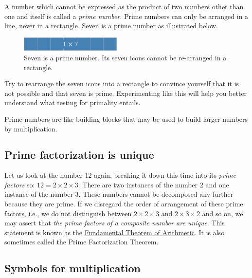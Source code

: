\documentclass[
  a4paper,
]{article}
\begin{document}
A number which cannot be expressed as the product of two numbers other
than one and itself is called a \emph{prime number}. Prime numbers can
only be arranged in a line, never in a rectangle. Seven is a prime
number as illustrated below.

\begin{figure}
\hypertarget{fig:seven}{%
\centering
\includegraphics[width=0.45\textwidth,height=\textheight]{images/seven.png}
\caption{Seven is a prime number. Its seven icons cannot be re-arranged
in a rectangle.}\label{fig:seven}
}
\end{figure}

Try to rearrange the seven icons into a rectangle to convince yourself
that it is not possible and that seven is prime. Experimenting like this
will help you better understand what testing for primality entails.

Prime numbers are like building blocks that may be used to build larger
numbers by multiplication.

\hypertarget{prime-factorization-is-unique}{%
\subsection{Prime factorization is
unique}\label{prime-factorization-is-unique}}

Let us look at the number \(12\) again, breaking it down this time into
its \emph{prime factors} so: \(12 = 2 \times 2 \times 3\). There are two
instances of the number \(2\) and one instance of the number \(3\).
These numbers cannot be decomposed any further because they are prime.
If we disregard the order of arrangement of these prime factors, i.e.,
we do not distinguish between \(2 \times 2 \times 3\) and
\(2 \times 3 \times 2\) and so on, we may assert that \emph{the prime
factors of a composite number are unique}. This statement is known as
the
\href{https://en.wikipedia.org/wiki/Fundamental_theorem_of_arithmetic}{Fundamental
Theorem of Arithmetic}. It is also sometimes called the Prime
Factorization Theorem.

\hypertarget{symbols-for-multiplication}{%
\subsection{Symbols for
multiplication}\label{symbols-for-multiplication}}
\end{document}
